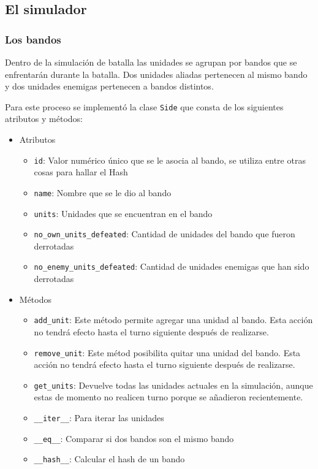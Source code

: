 \subsection{El simulador}

\subsubsection{Los bandos}

Dentro de la simulaci\'on de batalla las  unidades se agrupan por bandos que se enfrentar\'an durante la batalla. Dos unidades aliadas pertenecen al mismo bando y dos unidades enemigas pertenecen a bandos distintos.

Para este proceso se implement\'o la clase \verb|Side| que consta de los siguientes atributos y m\'etodos:
\begin{itemize}
\item Atributos
\begin{itemize}
\item \verb|id|: Valor num\'erico \'unico que se le asocia al bando, se utiliza entre otras cosas para hallar el Hash

\item \verb|name|: Nombre que se le dio al bando

\item \verb|units|: Unidades que se encuentran en el bando

\item \verb|no_own_units_defeated|: Cantidad de unidades del bando que fueron derrotadas

\item \verb|no_enemy_units_defeated|: Cantidad de unidades enemigas que han sido derrotadas

\end{itemize}

\item M\'etodos 
\begin{itemize}
\item \verb|add_unit|: Este m\'etodo permite agregar una unidad al bando. Esta acci\'on no tendr\'a efecto hasta el turno siguiente despu\'es de realizarse.

\item \verb|remove_unit|: Este m\'etod posibilita quitar una unidad del bando. Esta acci\'on no tendr\'a efecto hasta el turno siguiente despu\'es de realizarse.

\item \verb|get_units|: Devuelve todas las unidades actuales en la simulaci\'on, aunque estas de momento no realicen turno porque se añadieron recientemente.

\item \verb|__iter__|: Para iterar las unidades

\item \verb|__eq__|: Comparar si dos bandos son el mismo bando

\item \verb|__hash__|: Calcular el hash de un bando
\end{itemize}
\end{itemize}


